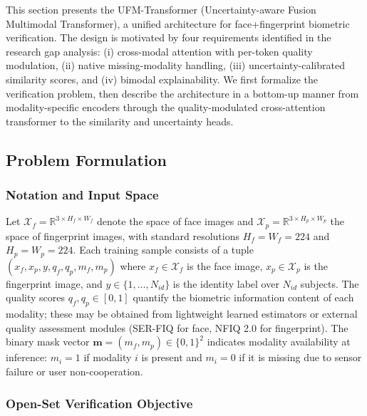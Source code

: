 \documentclass[10pt,journal,compsoc]{IEEEtran}
\begin{document}
This section presents the UFM-Transformer (Uncertainty-aware Fusion Multimodal Transformer), a unified architecture for face+fingerprint biometric verification. The design is motivated by four requirements identified in the research gap analysis: (i) cross-modal attention with per-token quality modulation, (ii) native missing-modality handling, (iii) uncertainty-calibrated similarity scores, and (iv) bimodal explainability. We first formalize the verification problem, then describe the architecture in a bottom-up manner from modality-specific encoders through the quality-modulated cross-attention transformer to the similarity and uncertainty heads.

\subsection{Problem Formulation}
\label{sec:problem_formulation}

\subsubsection{Notation and Input Space}

Let $\mathcal{X}_f = \mathbb{R}^{3 \times H_f \times W_f}$ denote the space of face images and $\mathcal{X}_p = \mathbb{R}^{3 \times H_p \times W_p}$ the space of fingerprint images, with standard resolutions $H_f = W_f = 224$ and $H_p = W_p = 224$. Each training sample consists of a tuple $(x_f, x_p, y, q_f, q_p, m_f, m_p)$ where $x_f \in \mathcal{X}_f$ is the face image, $x_p \in \mathcal{X}_p$ is the fingerprint image, and $y \in \{1, \dots, N_{id}\}$ is the identity label over $N_{id}$ subjects. The quality scores $q_f, q_p \in [0, 1]$ quantify the biometric information content of each modality; these may be obtained from lightweight learned estimators or external quality assessment modules (SER-FIQ \cite{terhorst2020serfiq} for face, NFIQ 2.0 \cite{tabassi2021nist} for fingerprint). The binary mask vector $\mathbf{m} = (m_f, m_p) \in \{0, 1\}^2$ indicates modality availability at inference: $m_i = 1$ if modality $i$ is present and $m_i = 0$ if it is missing due to sensor failure or user non-cooperation.

\subsubsection{Open-Set Verification Objective}
\end{document}
